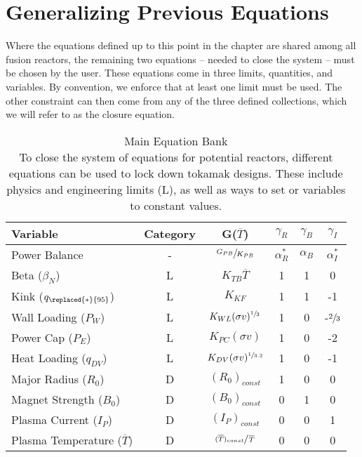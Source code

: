 \section{Generalizing Previous Equations}

Where the equations defined up to this point in the chapter are shared among all fusion reactors, the remaining two equations -- needed to close the system -- must be  chosen by the user. These equations come in three  limits,  quantities, and  variables. By convention, we enforce that at least one limit must be used. The other constraint can then come from any of the three defined collections, which we will refer to as the closure equation.

\begin{table}[hb!]
\caption[Main Equation Bank]{Main Equation Bank \\ \small To close the system of equations for potential reactors, different equations can be used to lock down tokamak designs. These include physics and engineering limits (L), as well as ways to set  or  variables to constant values.}
\begin{spacing}{1.5}
\begin{tabular}{lccccc}
 Variable & Category & G($\overline T$)  & $\gamma_R$ & $\gamma_B$ & $\gamma_{I}$ \\ \hline
Power Balance & - & $\sfrac{ G_{PB} }{ K_{PB} }$ & $\alpha_R^*$ & $\alpha_B$ & $\alpha_I^*$ \\
Beta ($\beta_N$) & L & $K_{TB} \overline T$ & 1 & 1 & 0 \\
Kink ($q_{\replaced{*}{95}}$) & L & $K_{KF} $ & 1 & 1 & -1 \\
Wall Loading ($P_W$) & L & $K_{WL} ( \sigma v )^{\sfrac{1}{3}} $ & 1 & 0 & -$\sfrac{2}{3}$ \\
Power Cap ($P_E$) & L & $K_{PC} ( \sigma v ) $ & 1 & 0 & -2 \\
Heat Loading ($q_{DV}$) & L & $K_{DV} ( \sigma v )^{\sfrac{1}{3.2}} $ & 1 & 0 & -1 \\
Major Radius ($R_0$) & D & $(R_0)_{const}$ & 1 & 0 & 0 \\
Magnet Strength ($B_0$) & D & $(B_0)_{const}$ & 0 & 1 & 0 \\
Plasma Current ($I_P$) & D & $(I_P)_{const}$ & 0 & 0 & 1 \\
Plasma Temperature ($\overline T$) & D & $\sfrac{ (\overline T)_{const} }{ \, \overline T }$ & 0 & 0 & 0 \\

\end{tabular}
\end{spacing}
\end{table}
